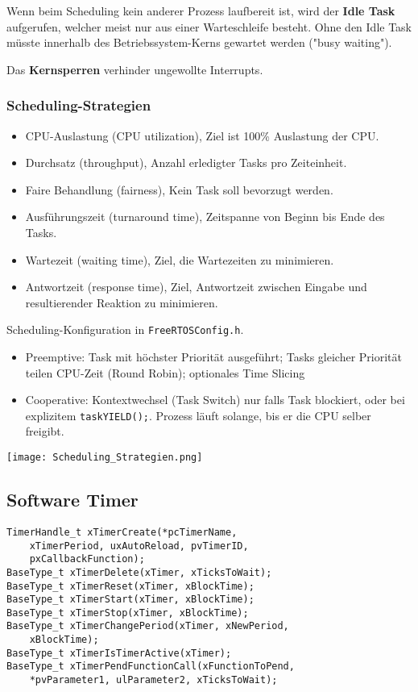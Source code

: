 Wenn beim Scheduling kein anderer Prozess laufbereit ist, wird der \textbf{Idle Task} aufgerufen, welcher meist nur aus einer Warteschleife besteht.
Ohne den Idle Task müsste innerhalb des Betriebssystem-Kerns gewartet werden ("busy waiting").

Das \textbf{Kernsperren} verhinder ungewollte Interrupts.

\subsubsection{Scheduling-Strategien}

\begin{itemize}
	\itemsep-.5em 
	\item CPU-Auslastung (CPU utilization), Ziel ist 100\% Auslastung der CPU.
	\item Durchsatz (throughput), Anzahl erledigter Tasks pro Zeiteinheit.
	\item Faire Behandlung (fairness), Kein Task soll bevorzugt werden.
	\item Ausführungszeit (turnaround time), Zeitspanne von Beginn bis Ende des Tasks.
	\item Wartezeit (waiting time), Ziel, die Wartezeiten zu minimieren.
	\item Antwortzeit (response time), Ziel, Antwortzeit zwischen Eingabe und resultierender Reaktion zu minimieren.
\end{itemize}

Scheduling-Konfiguration in \lstinline[style=cppstyle]|FreeRTOSConfig.h|.

\begin{itemize}
	\itemsep-.5em 
	\item Preemptive:	Task mit höchster Priorität ausgeführt; Tasks gleicher Priorität teilen CPU-Zeit (Round Robin);	optionales Time Slicing
	\item Cooperative:	Kontextwechsel (Task Switch) nur falls Task blockiert, oder bei explizitem \lstinline[style=cppstyle]|taskYIELD();|. Prozess läuft solange, bis er die CPU selber freigibt.
\end{itemize}

\texttt{[image: Scheduling\_Strategien.png]}


\subsection{Software Timer}

\begin{lstlisting}[style=cppstyle]
TimerHandle_t xTimerCreate(*pcTimerName,
	xTimerPeriod, uxAutoReload, pvTimerID,
	pxCallbackFunction);
BaseType_t xTimerDelete(xTimer, xTicksToWait);
BaseType_t xTimerReset(xTimer, xBlockTime);
BaseType_t xTimerStart(xTimer, xBlockTime);
BaseType_t xTimerStop(xTimer, xBlockTime);
BaseType_t xTimerChangePeriod(xTimer, xNewPeriod,
	xBlockTime);
BaseType_t xTimerIsTimerActive(xTimer);
BaseType_t xTimerPendFunctionCall(xFunctionToPend,
	*pvParameter1, ulParameter2, xTicksToWait);
\end{lstlisting}





